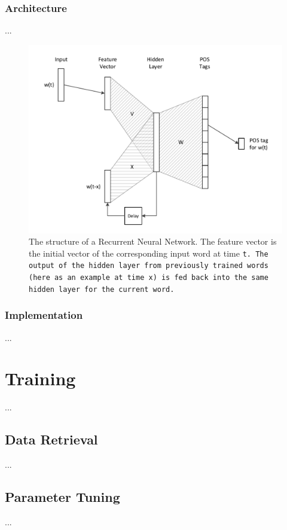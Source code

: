 \subsection{Architecture}\label{c.postagging.rnn.architecture}
...
\begin{figure}[H]
	\includegraphics[width=\textwidth]{images/rnn_structure}
	\caption{The structure of a Recurrent Neural Network. The feature vector is the initial vector of the corresponding input word at time \tt{t}. The output of the hidden layer from previously trained words (here as an example at time \tt{x}) is fed back into the same hidden layer for the current word.}\label{f.rnn_structure}
\end{figure}

\subsection{Implementation}\label{c.postagging.rnn.implementation}
...

\chapter{Training}\label{c.training}
...

\section{Data Retrieval}\label{c.training.data}
...

\section{Parameter Tuning}\label{c.training.tuning}
...

